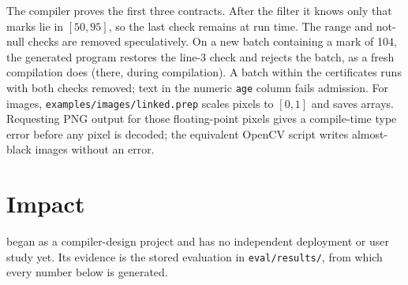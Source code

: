 The compiler proves the first three contracts. After the filter it knows only that marks lie in
$[50,95]$, so the last check remains at run time. The range and not-null checks are removed
speculatively. On a new batch containing a mark of 104, the generated program restores the line-3 check
and rejects the batch, as a fresh compilation does (there, during compilation). A batch within the
certificates runs with both checks removed; text in the numeric \texttt{age} column fails admission.
For images, \texttt{examples/\allowbreak images/\allowbreak linked.prep} scales pixels to $[0,1]$ and saves
arrays. Requesting PNG output for those floating-point pixels gives a compile-time type error before any
pixel is decoded; the equivalent OpenCV script writes almost-black images without an error.

\section{Impact}\label{sec:impact}

\PL began as a compiler-design project and has no independent deployment or user study yet. Its
evidence is the stored evaluation in \texttt{eval/results/}, from which every number below is generated.

